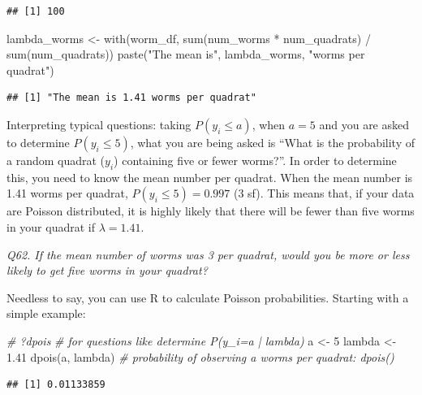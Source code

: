 \documentclass[
  11pt,
  a4paper,
]{book}
\newenvironment{Shaded}{\begin{snugshade}}{\end{snugshade}}
\newcommand{\CommentTok}[1]{\textcolor[rgb]{0.56,0.35,0.01}{\textit{#1}}}
\newcommand{\DecValTok}[1]{\textcolor[rgb]{0.00,0.00,0.81}{#1}}
\newcommand{\FloatTok}[1]{\textcolor[rgb]{0.00,0.00,0.81}{#1}}
\newcommand{\FunctionTok}[1]{\textcolor[rgb]{0.00,0.00,0.00}{#1}}
\newcommand{\NormalTok}[1]{#1}
\newcommand{\OtherTok}[1]{\textcolor[rgb]{0.56,0.35,0.01}{#1}}
\newcommand{\SpecialCharTok}[1]{\textcolor[rgb]{0.00,0.00,0.00}{#1}}
\newcommand{\StringTok}[1]{\textcolor[rgb]{0.31,0.60,0.02}{#1}}
\begin{document}
\begin{verbatim}
## [1] 100
\end{verbatim}

\begin{Shaded}
\begin{Highlighting}[]
\NormalTok{lambda\_worms }\OtherTok{\textless{}{-}} \FunctionTok{with}\NormalTok{(worm\_df, }\FunctionTok{sum}\NormalTok{(num\_worms }\SpecialCharTok{*}\NormalTok{ num\_quadrats) }\SpecialCharTok{/} \FunctionTok{sum}\NormalTok{(num\_quadrats))}
\FunctionTok{paste}\NormalTok{(}\StringTok{"The mean is"}\NormalTok{, lambda\_worms, }\StringTok{"worms per quadrat"}\NormalTok{)}
\end{Highlighting}
\end{Shaded}

\begin{verbatim}
## [1] "The mean is 1.41 worms per quadrat"
\end{verbatim}

Interpreting typical questions: taking \(P(y_i \leq a)\), when \(a=5\) and you are asked to determine \(P(y_i \leq 5)\), what you are being asked is ``What is the probability of a random quadrat (\(y_i\)) containing five or fewer worms?''. In order to determine this, you need to know the mean number per quadrat. When the mean number is 1.41 worms per quadrat, \(P(y_i \leq 5) = 0.997\) (3 sf). This means that, if your data are Poisson distributed, it is highly likely that there will be fewer than five worms in your quadrat if \(\lambda = 1.41\).

\emph{Q62. If the mean number of worms was 3 per quadrat, would you be more or less likely to get five worms in your quadrat?}

Needless to say, you can use R to calculate Poisson probabilities. Starting with a simple example:

\begin{Shaded}
\begin{Highlighting}[]
\CommentTok{\# ?dpois }
\CommentTok{\# for questions like \textquotesingle{}determine P(y\_i=a | lambda)\textquotesingle{}}
\NormalTok{a }\OtherTok{\textless{}{-}} \DecValTok{5} 
\NormalTok{lambda }\OtherTok{\textless{}{-}} \FloatTok{1.41} 
\FunctionTok{dpois}\NormalTok{(a, lambda) }\CommentTok{\# probability of observing \textquotesingle{}a\textquotesingle{} worms per quadrat: dpois()}
\end{Highlighting}
\end{Shaded}

\begin{verbatim}
## [1] 0.01133859
\end{verbatim}
\end{document}
